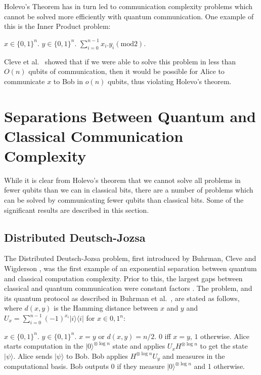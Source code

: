 \documentclass[a4paper]{article}
\begin{document}
        Holevo's Theorem has in turn led to communication complexity problems which cannot be solved more efficiently with quantum communication. One example of this is the Inner Product problem:

        \begin{codebox}
            \zi {} $x \in \{0, 1\}^n$.
            \zi {} $y \in \{0, 1\}^n$.
            \zi {} $\sum_{i = 0}^{n - 1}x_i.y_i (\textrm{mod} 2)$.
        \end{codebox}

        Cleve et al.~\cite{Cleve201311} showed that if we were able to solve this problem in less than $O(n)$ qubits of communication, then it would be possible for Alice to communicate $x$ to Bob in $o(n)$ qubits, thus violating Holevo's theorem.

    \section{Separations Between Quantum and Classical Communication Complexity}
    \label{sec:separations}

        While it is clear from Holevo's theorem that we cannot solve all problems in fewer qubits than we can in classical bits, there are a number of problems which can be solved by communicating fewer qubits than classical bits. Some of the significant results are described in this section.

        \subsection{Distributed Deutsch-Jozsa}

        The Distributed Deutsch-Jozsa problem, first introduced by Buhrman, Cleve and Wigderson \cite{Buhrman:1998:QVC:276698.276713}, was the first example of an exponential separation between quantum and classical computation complexity. Prior to this, the largest gaps between classical and quantum communication were constant factors \cite{PhysRevA.56.1201}. The problem, and its quantum protocol as described in Buhrman et al.~\cite{RevModPhys.82.665}, are stated as follows, where $d(x, y)$ is the Hamming distance between $x$ and $y$ and $U_x = \sum_{i=0}^{n-1}(-1)^{x_i}|i\rangle\langle i|$ for $x \in {0, 1}^n$:

        \begin{codebox}
            \zi {} $x \in \{0, 1\}^n$.
            \zi {} $y \in \{0, 1\}^n$.
            \zi {} $x = y$ or $d(x, y) = n/2$.
            \zi {} $0$ iff $x = y$, $1$ otherwise.
            \li Alice starts computation in the $|0\rangle^{\otimes \log n}$ state and applies $U_xH^{\otimes \log n}$ to get the state $|\psi\rangle$.
            \li Alice sends $|\psi\rangle$ to Bob.
            \li Bob applies $H^{\otimes \log n}U_y$ and measures in the computational basis.
            \li Bob outputs $0$ if they measure $|0\rangle^{\otimes \log n}$ and 1 otherwise.
            \End
        \end{codebox}
\end{document}
